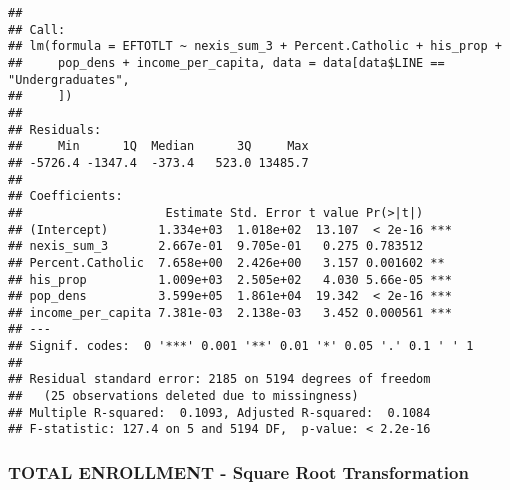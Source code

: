 \documentclass[]{article}
\newenvironment{Shaded}{\begin{snugshade}}{\end{snugshade}}
\newcommand{\KeywordTok}[1]{\textcolor[rgb]{0.13,0.29,0.53}{\textbf{#1}}}
\newcommand{\DataTypeTok}[1]{\textcolor[rgb]{0.13,0.29,0.53}{#1}}
\newcommand{\DecValTok}[1]{\textcolor[rgb]{0.00,0.00,0.81}{#1}}
\newcommand{\StringTok}[1]{\textcolor[rgb]{0.31,0.60,0.02}{#1}}
\newcommand{\OperatorTok}[1]{\textcolor[rgb]{0.81,0.36,0.00}{\textbf{#1}}}
\newcommand{\NormalTok}[1]{#1}
\begin{document}
\begin{verbatim}
## 
## Call:
## lm(formula = EFTOTLT ~ nexis_sum_3 + Percent.Catholic + his_prop + 
##     pop_dens + income_per_capita, data = data[data$LINE == "Undergraduates", 
##     ])
## 
## Residuals:
##     Min      1Q  Median      3Q     Max 
## -5726.4 -1347.4  -373.4   523.0 13485.7 
## 
## Coefficients:
##                    Estimate Std. Error t value Pr(>|t|)    
## (Intercept)       1.334e+03  1.018e+02  13.107  < 2e-16 ***
## nexis_sum_3       2.667e-01  9.705e-01   0.275 0.783512    
## Percent.Catholic  7.658e+00  2.426e+00   3.157 0.001602 ** 
## his_prop          1.009e+03  2.505e+02   4.030 5.66e-05 ***
## pop_dens          3.599e+05  1.861e+04  19.342  < 2e-16 ***
## income_per_capita 7.381e-03  2.138e-03   3.452 0.000561 ***
## ---
## Signif. codes:  0 '***' 0.001 '**' 0.01 '*' 0.05 '.' 0.1 ' ' 1
## 
## Residual standard error: 2185 on 5194 degrees of freedom
##   (25 observations deleted due to missingness)
## Multiple R-squared:  0.1093, Adjusted R-squared:  0.1084 
## F-statistic: 127.4 on 5 and 5194 DF,  p-value: < 2.2e-16
\end{verbatim}

\subsubsection{TOTAL ENROLLMENT - Square Root
Transformation}\label{total-enrollment---square-root-transformation-1}

\begin{Shaded}
\end{Shaded}
\end{document}
